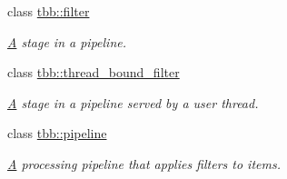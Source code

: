 \begin{DoxyCompactItemize}
class \hyperlink{classtbb_1_1filter}{tbb\+::filter}
\begin{DoxyCompactList}\small\item\em \hyperlink{structA}{A} stage in a pipeline. \end{DoxyCompactList}\item 
class \hyperlink{classtbb_1_1thread__bound__filter}{tbb\+::thread\+\_\+bound\+\_\+filter}
\begin{DoxyCompactList}\small\item\em \hyperlink{structA}{A} stage in a pipeline served by a user thread. \end{DoxyCompactList}\item 
class \hyperlink{classtbb_1_1pipeline}{tbb\+::pipeline}
\begin{DoxyCompactList}\small\item\em \hyperlink{structA}{A} processing pipeline that applies filters to items. \end{DoxyCompactList}\end{DoxyCompactItemize}
